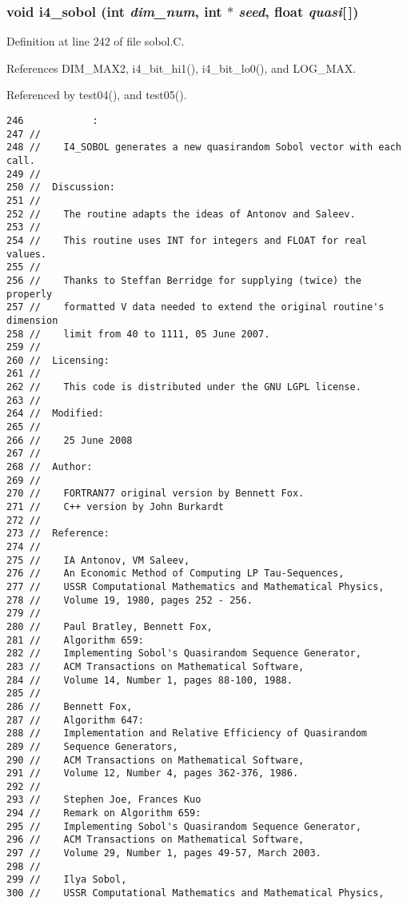\subsubsection{\setlength{\rightskip}{0pt plus 5cm}void i4\_\-sobol (int {\em dim\_\-num}, int $\ast$ {\em seed}, float {\em quasi}[$\,$])}\label{sobol_8C_48eef243aae5f2979b1f88a3867b34e0}




Definition at line 242 of file sobol.C.

References DIM\_\-MAX2, i4\_\-bit\_\-hi1(), i4\_\-bit\_\-lo0(), and LOG\_\-MAX.

Referenced by test04(), and test05().

\begin{Code}\begin{verbatim}246            :
247 //
248 //    I4_SOBOL generates a new quasirandom Sobol vector with each call.
249 //
250 //  Discussion:
251 //
252 //    The routine adapts the ideas of Antonov and Saleev.
253 //
254 //    This routine uses INT for integers and FLOAT for real values.
255 //
256 //    Thanks to Steffan Berridge for supplying (twice) the properly
257 //    formatted V data needed to extend the original routine's dimension
258 //    limit from 40 to 1111, 05 June 2007.
259 //
260 //  Licensing:
261 //
262 //    This code is distributed under the GNU LGPL license. 
263 //
264 //  Modified:
265 //
266 //    25 June 2008
267 //
268 //  Author:
269 //
270 //    FORTRAN77 original version by Bennett Fox.
271 //    C++ version by John Burkardt
272 //
273 //  Reference:
274 //
275 //    IA Antonov, VM Saleev,
276 //    An Economic Method of Computing LP Tau-Sequences,
277 //    USSR Computational Mathematics and Mathematical Physics,
278 //    Volume 19, 1980, pages 252 - 256.
279 //
280 //    Paul Bratley, Bennett Fox,
281 //    Algorithm 659:
282 //    Implementing Sobol's Quasirandom Sequence Generator,
283 //    ACM Transactions on Mathematical Software,
284 //    Volume 14, Number 1, pages 88-100, 1988.
285 //
286 //    Bennett Fox,
287 //    Algorithm 647:
288 //    Implementation and Relative Efficiency of Quasirandom 
289 //    Sequence Generators,
290 //    ACM Transactions on Mathematical Software,
291 //    Volume 12, Number 4, pages 362-376, 1986.
292 //
293 //    Stephen Joe, Frances Kuo
294 //    Remark on Algorithm 659:
295 //    Implementing Sobol's Quasirandom Sequence Generator,
296 //    ACM Transactions on Mathematical Software,
297 //    Volume 29, Number 1, pages 49-57, March 2003.
298 //
299 //    Ilya Sobol,
300 //    USSR Computational Mathematics and Mathematical Physics,

\end{verbatim}
\end{Code}
